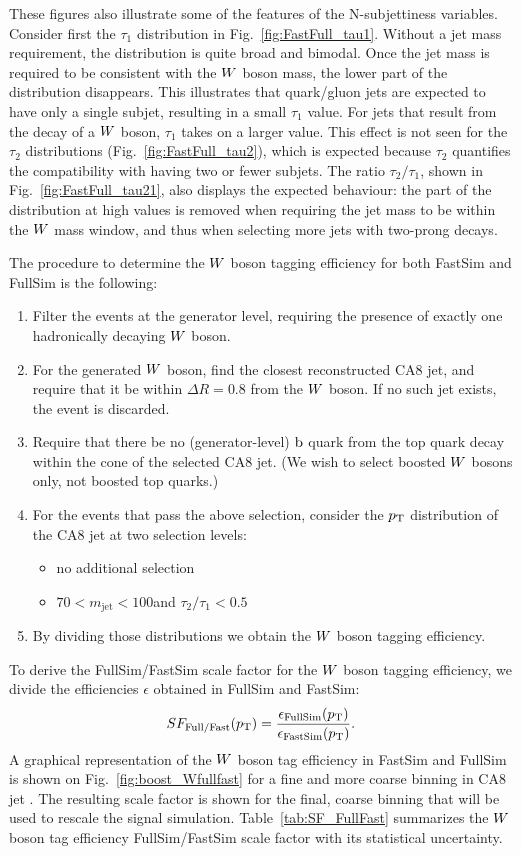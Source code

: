 These figures also illustrate some of the features of the N-subjettiness variables.
Consider first the $\tau_1$ distribution in Fig.~\ref{fig:FastFull_tau1}. Without a jet mass
requirement, the distribution is quite broad and bimodal. Once the jet mass is required to
be consistent with the $W$ boson mass, the lower part of the distribution disappears. This
illustrates that quark/gluon jets are expected to have only a single subjet, resulting in a small
$\tau_1$ value. For jets that result from the decay of a $W$ boson, $\tau_1$ takes on a larger
value. 
This effect is not seen for the $\tau_2$ distributions (Fig.~\ref{fig:FastFull_tau2}), which is
expected because $\tau_2$ quantifies the compatibility with having two or fewer subjets. 
The ratio $\tau_2/\tau_1$, shown in Fig.~\ref{fig:FastFull_tau21}, also displays the
expected behaviour: the part of the distribution at high values is removed when requiring the jet
mass to be within the $W$ mass window, and thus when selecting more jets with two-prong decays. 

The procedure to determine the $W$ boson tagging efficiency for both FastSim and FullSim is the
following:
\begin{enumerate}
\item Filter the events at the generator level, requiring the presence of exactly one hadronically
decaying $W$ boson. 
\item For the generated $W$ boson, find the closest reconstructed CA8 jet, and require that it be
within $\Delta R = 0.8$ from the $W$ boson. If no such jet exists, the event is discarded.  
\item Require that there be no (generator-level) $\mathrm{b}$ quark from the top quark decay within the
cone of the selected CA8 jet. (We wish to select boosted $W$ bosons only, not boosted top quarks.)
\item For the events that pass the above selection, consider the $p_{\mathrm{T}}$ distribution of the CA8 jet
at two selection levels:
 \begin{itemize}
   \item no additional selection
   \item $70 < m_\textrm{jet} < 100$\GeV and $\tau_2/\tau_1 < 0.5$
 \end{itemize}
\item By dividing those \pt distributions we obtain the $W$ boson tagging efficiency. 
\end{enumerate}
To derive the FullSim/FastSim scale factor for the $W$ boson tagging efficiency, we divide the
efficiencies $\epsilon$ obtained in FullSim and FastSim:
\begin{equation}
SF_{\textrm{Full/Fast}}(p_{\mathrm{T}}) =
\frac{\epsilon_{\textrm{FullSim}}(p_{\mathrm{T}})}{\epsilon_{\textrm{FastSim}}(p_{\mathrm{T}})}.
\end{equation}
A graphical representation of the $W$ boson tag efficiency in FastSim and FullSim is shown on
Fig.~\ref{fig:boost_Wfullfast} for a fine and more coarse binning in CA8 jet \pt. The resulting
scale factor is shown for the final, coarse binning that will be used to rescale the signal
simulation. 
Table~\ref{tab:SF_FullFast} summarizes the $W$ boson tag efficiency FullSim/FastSim scale factor
with its
statistical uncertainty.

